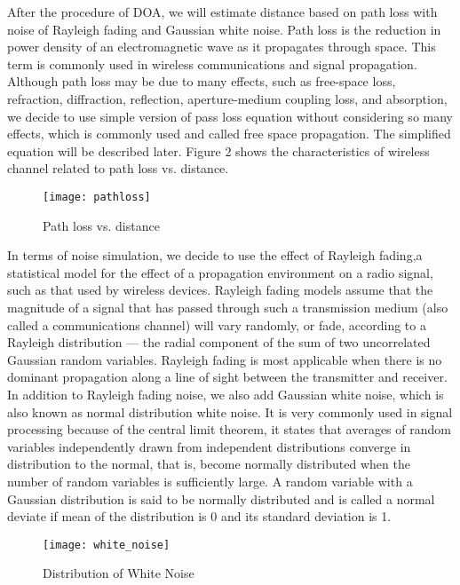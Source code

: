 \par
	After the procedure of DOA, we will estimate distance based on path loss with noise of Rayleigh fading and Gaussian white noise. Path loss is the reduction in power density of an electromagnetic wave as it propagates through space. This term is commonly used in wireless communications and signal propagation. Although path loss may be due to many effects, such as free-space loss, refraction, diffraction, reflection, aperture-medium coupling loss, and absorption, we decide to use simple version of pass loss equation without considering so many effects, which is commonly used and called free space propagation. The simplified equation will be described later. Figure 2 shows the characteristics of wireless channel related to path loss vs. distance. \cite{elsayed} \cite{wiki:Pathloss} 
	\begin{figure}[ht]
	\centering
	\texttt{[image: pathloss]}
	\caption{Path loss vs. distance}
	\end{figure}
\par
	In terms of noise simulation, we decide to use the effect of Rayleigh fading,a statistical model for the effect of a propagation environment on a radio signal, such as that used by wireless devices. Rayleigh fading models assume that the magnitude of a signal that has passed through such a transmission medium (also called a communications channel) will vary randomly, or fade, according to a Rayleigh distribution — the radial component of the sum of two uncorrelated Gaussian random variables. Rayleigh fading is most applicable when there is no dominant propagation along a line of sight between the transmitter and receiver. In addition to Rayleigh fading noise, we also add Gaussian white noise, which is also known as normal distribution white noise. It is very commonly used in signal processing because of the central limit theorem, it states that averages of random variables independently drawn from independent distributions converge in distribution to the normal, that is, become normally distributed when the number of random variables is sufficiently large.  A random variable with a Gaussian distribution is said to be normally distributed and is called a normal deviate if mean of the distribution is 0 and its standard deviation is 1. \cite{wiki:Rayleighfading} \cite{wiki:Normaldistribution} \cite{white_noise}
	\begin{figure}[ht]
	\centering
	\texttt{[image: white\_noise]}
	\caption{Distribution of White Noise}
	\end{figure}


